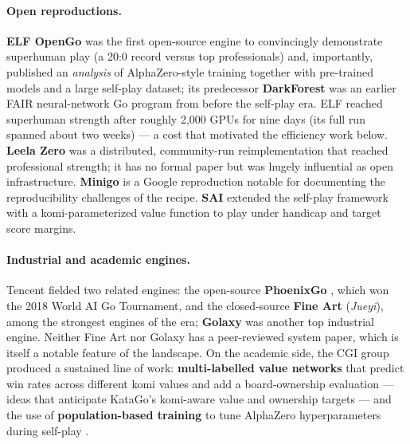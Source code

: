 \documentclass[11pt]{article}
\begin{document}
\paragraph{Open reproductions.}
\textbf{ELF OpenGo} \cite{elfopengo2019} was the first open-source engine to convincingly
demonstrate superhuman play (a 20:0 record versus top professionals) and, importantly,
published an \emph{analysis} of AlphaZero-style training together with pre-trained models
and a large self-play dataset; its predecessor \textbf{DarkForest} \cite{darkforest2016}
was an earlier FAIR neural-network Go program from before the self-play era. ELF reached
superhuman strength after roughly 2{,}000 GPUs for nine days (its full run spanned about two
weeks) --- a cost that motivated the efficiency work below.
\textbf{Leela Zero} \cite{leelazero} was a distributed, community-run reimplementation that
reached professional strength; it has no formal paper but was hugely influential as open
infrastructure. \textbf{Minigo} \cite{minigo2019} is a Google reproduction notable for
documenting the reproducibility challenges of the recipe. \textbf{SAI} \cite{sai2019}
extended the self-play framework with a komi-parameterized value function to play under
handicap and target score margins.

\paragraph{Industrial and academic engines.}
Tencent fielded two related engines: the open-source \textbf{PhoenixGo} \cite{phoenixgo},
which won the 2018 World AI Go Tournament, and the closed-source \textbf{Fine Art}
(\emph{Jueyi}), among the strongest engines of the era; \textbf{Golaxy} was another top
industrial engine. Neither Fine Art nor Golaxy has a peer-reviewed system paper, which is
itself a notable feature of the landscape. On the academic side, the CGI group produced a
sustained line of work: \textbf{multi-labelled value networks} that predict win rates
across different komi values and add a board-ownership evaluation \cite{multilabel2018} ---
ideas that anticipate KataGo's komi-aware value and ownership targets --- and the use of
\textbf{population-based training} to tune AlphaZero hyperparameters during self-play
\cite{pbt2020}.
\end{document}
